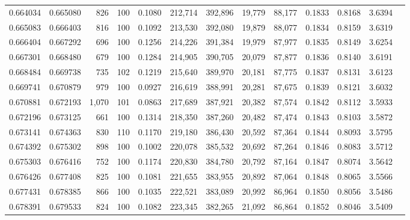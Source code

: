 \begin{tabular}{rrrrrrrrrrrrr}
0.664034 & 0.665080 &   826 & 100 &                                     0.1080 & 212,714 & 392,896 &  19,779 &  88,177 & 0.1833 & 0.8168 & 3.6394 \\
0.665083 & 0.666403 &   816 & 100 &                                     0.1092 & 213,530 & 392,080 &  19,879 &  88,077 & 0.1834 & 0.8159 & 3.6319 \\
0.666404 & 0.667292 &   696 & 100 &                                     0.1256 & 214,226 & 391,384 &  19,979 &  87,977 & 0.1835 & 0.8149 & 3.6254 \\
0.667301 & 0.668480 &   679 & 100 &                                     0.1284 & 214,905 & 390,705 &  20,079 &  87,877 & 0.1836 & 0.8140 & 3.6191 \\
0.668484 & 0.669738 &   735 & 102 &                                     0.1219 & 215,640 & 389,970 &  20,181 &  87,775 & 0.1837 & 0.8131 & 3.6123 \\
0.669741 & 0.670879 &   979 & 100 &                                     0.0927 & 216,619 & 388,991 &  20,281 &  87,675 & 0.1839 & 0.8121 & 3.6032 \\
0.670881 & 0.672193 & 1,070 & 101 &                                     0.0863 & 217,689 & 387,921 &  20,382 &  87,574 & 0.1842 & 0.8112 & 3.5933 \\
0.672196 & 0.673125 &   661 & 100 &                                     0.1314 & 218,350 & 387,260 &  20,482 &  87,474 & 0.1843 & 0.8103 & 3.5872 \\
0.673141 & 0.674363 &   830 & 110 &                                     0.1170 & 219,180 & 386,430 &  20,592 &  87,364 & 0.1844 & 0.8093 & 3.5795 \\
0.674392 & 0.675302 &   898 & 100 &                                     0.1002 & 220,078 & 385,532 &  20,692 &  87,264 & 0.1846 & 0.8083 & 3.5712 \\
0.675303 & 0.676416 &   752 & 100 &                                     0.1174 & 220,830 & 384,780 &  20,792 &  87,164 & 0.1847 & 0.8074 & 3.5642 \\
0.676426 & 0.677408 &   825 & 100 &                                     0.1081 & 221,655 & 383,955 &  20,892 &  87,064 & 0.1848 & 0.8065 & 3.5566 \\
0.677431 & 0.678385 &   866 & 100 &                                     0.1035 & 222,521 & 383,089 &  20,992 &  86,964 & 0.1850 & 0.8056 & 3.5486 \\
0.678391 & 0.679533 &   824 & 100 &                                     0.1082 & 223,345 & 382,265 &  21,092 &  86,864 & 0.1852 & 0.8046 & 3.5409 \\

\end{tabular}
